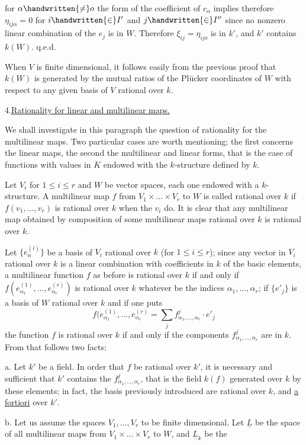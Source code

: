 
for $\alpha\handwritten{\ne}o$ the form of the coefficient of $c_\alpha$ implies therefore $\eta_{ij\alpha}=0$ for $i\handwritten{\in}I'$ and $j\handwritten{\in}I''$ since no nonzero linear combination of the $e_j$ is in $W$. Therefore $\xi_{ij}=\eta_{ijo}$ is in $k'$, and $k'$ contains $k(W)$. \hfill q.e.d.

When $V$ is finite dimensional, it follows easily from the previous proof that $k(W)$ is generated by the mutual ratios of the Plücker coordinates of $W$ with respect to any given basis of $V$ rational over $k$.

4.\quad \uline{Rationality for linear and multilinear maps.}

We shall investigate in this paragraph the question of rationality for the multilinear maps. Two particular cases are worth mentioning; the first concerns the linear maps, the second the multilinear and linear forms, that is the case of functions with values in $K$ endowed with the $k$-structure defined by $k$.

Let $V_i$ for $1\leq i\leq r$ and $W$ be vector spaces, each one endowed with a $k$-structure. A multilinear map $f$ from $V_1\times\ldots\times V_r$ to $W$ is called rational over $k$ if $f(v_1,\ldots,v_r)$ is rational over $k$ when the $v_i$ do. It is clear that any multilinear map obtained by composition of some multilinear maps rational over $k$ is rational over $k$.

Let $\{e_\alpha^{(i)}\}$ be a basis of $V_i$ rational over $k$ (for $1\leq i\leq r$); since any vector in $V_i$ rational over $k$ is a linear combination with coefficients in $k$ of the basic elements, a multilinear function $f$ as before is rational over $k$ if and only if $f(e_{\alpha_1}^{(1)},\ldots,e_{\alpha_r}^{(r)})$ is rational over $k$ whatever be the indices $\alpha_1,\ldots,\alpha_r$; if $\{e'_j\}$ is a basis of $W$ rational over $k$ and if one puts
\[
f(e_{\alpha_1}^{(1)},\ldots,e_{\alpha_r}^{(r)}=\sum_j f^j_{\alpha_1,\ldots,\alpha_r}\cdot e'_j
\tag*{(4)}
\]
the function $f$ is rational over $k$ if and only if the components $f^j_{\alpha_1,\ldots,\alpha_r}$ are in $k$. From that follows two facts:

a. Let $k'$ be a field. In order that $f$ be rational over $k'$, it is necessary and sufficient that $k'$ contains the $f^j_{\alpha_1,\ldots,\alpha_r}$, that is the field $k(f)$ generated over $k$ by these elements; in fact, the basis previously introduced are rational over $k$, and \uline{a fortiori} over $k'$.

b. Let us assume the spaces $V_1,\ldots,V_r$ to be finite dimensional. Let $\underline{L}$ be the space of all multilinear maps from $V_1\times\ldots\times V_r$ to $W$, and $\underline{L}_k$ be the

